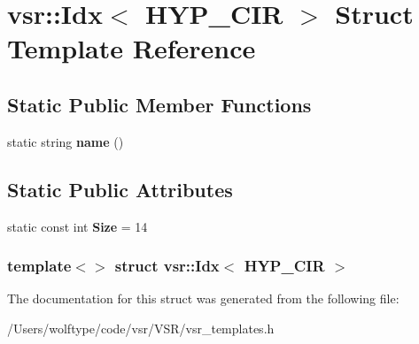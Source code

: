 \hypertarget{structvsr_1_1_idx_3_01_h_y_p___c_i_r_01_4}{\section{vsr\-:\-:Idx$<$ H\-Y\-P\-\_\-\-C\-I\-R $>$ Struct Template Reference}
\label{structvsr_1_1_idx_3_01_h_y_p___c_i_r_01_4}
}
\subsection*{Static Public Member Functions}
\begin{DoxyCompactItemize}
\item 
\hypertarget{structvsr_1_1_idx_3_01_h_y_p___c_i_r_01_4_a4373a28f606e1ef9e56ad0d776186e33}{static string {\bfseries name} ()}\label{structvsr_1_1_idx_3_01_h_y_p___c_i_r_01_4_a4373a28f606e1ef9e56ad0d776186e33}

\end{DoxyCompactItemize}
\subsection*{Static Public Attributes}
\begin{DoxyCompactItemize}
\item 
\hypertarget{structvsr_1_1_idx_3_01_h_y_p___c_i_r_01_4_a27fa5cd9a2b9bbef02fd74ed8f333291}{static const int {\bfseries Size} = 14}\label{structvsr_1_1_idx_3_01_h_y_p___c_i_r_01_4_a27fa5cd9a2b9bbef02fd74ed8f333291}

\end{DoxyCompactItemize}
\subsubsection*{template$<$$>$ struct vsr\-::\-Idx$<$ H\-Y\-P\-\_\-\-C\-I\-R $>$}



The documentation for this struct was generated from the following file\-:\begin{DoxyCompactItemize}
\item 
/\-Users/wolftype/code/vsr/\-V\-S\-R/vsr\-\_\-templates.\-h\end{DoxyCompactItemize}
